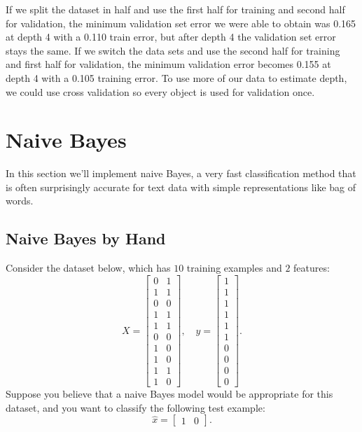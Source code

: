 \documentclass{article}
\begin{document}
If we split the dataset in half and use the first half for training and second half for validation, the minimum validation set error we were able to obtain was 0.165 at depth 4 with a 0.110 train error, but after depth 4 the validation set error stays the same. If we switch the data sets and use the second half for training and first half for validation, the minimum validation error becomes 0.155 at depth 4 with a 0.105 training error. To use more of our data to estimate depth, we could use cross validation so every object is used for validation once.

\section{Naive Bayes}

In this section we'll implement naive Bayes, a very fast classification method that is often surprisingly accurate for text data with simple representations like bag of words.



\subsection{Naive Bayes by Hand}

Consider the dataset below, which has $10$ training examples and $2$ features:
\[
X = \begin{bmatrix}0 & 1\\1 & 1\\ 0 & 0\\ 1 & 1\\ 1 & 1\\ 0 & 0\\  1 & 0\\  1 & 0\\  1 & 1\\  1 &0\end{bmatrix}, \quad y = \begin{bmatrix}1\\1\\1\\1\\1\\1\\0\\0\\0\\0\end{bmatrix}.
\]
Suppose you believe that a naive Bayes model would be appropriate for this dataset, and you want to classify the following test example:
\[
\hat{x} = \begin{bmatrix}1 & 0\end{bmatrix}.
\]
\end{document}
